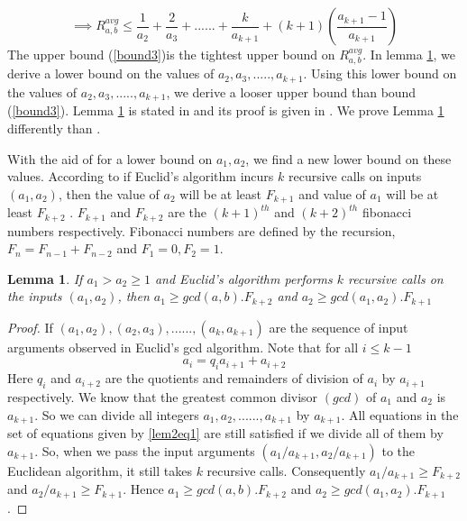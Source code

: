 \documentclass[pdflatex,sn-mathphys-num]{sn-jnl}%
\newtheorem{lem}{Lemma}
\theoremstyle{thmstyleone}%
\theoremstyle{thmstyletwo}%
\theoremstyle{thmstylethree}%
\begin{document}
\begin{equation}\label{bound3}
 \implies R_{a,b}^{avg} \le  \frac{1}{a_2}+\frac{2}{a_3}+......+\frac{k}{a_{k+1}}+(k+1)\left(\frac{a_{k+1}-1}{a_{k+1}}\right) 
\end{equation}
The upper bound (\ref{bound3})is the tightest upper bound on $R_{a,b}^{avg}$.
In lemma \ref{lem2}, we derive a lower bound on the values of $a_2,a_3,.....,a_{k+1}$. Using this lower bound on the values of $a_2,a_3,.....,a_{k+1}$, we derive a looser upper bound than bound (\ref{bound3}). Lemma \ref{lem2} is stated in \cite{cormen2009introduction} and its proof is given in \cite{Cormen_Sol_ref}. We prove Lemma \ref{lem2} differently than  \cite{Cormen_Sol_ref}.
\par With the aid of \cite[Lemma 31.10]{cormen2009introduction} for a lower bound on $a_1,a_2$, we find a new lower bound on these values. According to \cite[Lemma 31.10]{cormen2009introduction} 
if Euclid's algorithm incurs $k$ recursive calls on inputs $(a_1,a_2)$, then the value of $a_2$ will be at least $F_{k+1}$ and value of $a_1$ will be at least $F_{k+2}$ \cite[Lemma 31.10]{cormen2009introduction}. $F_{k+1}$ and $F_{k+2}$ are the  $(k+1)^{th}$ and $(k+2)^{th}$  fibonacci numbers respectively. Fibonacci numbers are defined by the recursion, $F_n=F_{n-1}+F_{n-2}$ and $F_{1}=0,F_2=1$. 
\newline
\begin{lem}\label{lem2}
If $a_1>a_2\ge 1$ and Euclid's algorithm performs $k$ recursive calls on the inputs $(a_1,a_2)$, then $a_1\ge gcd(a,b).F_{k+2}$ and $a_2 \ge gcd(a_1,a_2).F_{k+1}$

\end{lem}
\begin{proof}
   If $(a_1,a_2),(a_2,a_3),......,(a_k,a_{k+1})$ are the sequence of input arguments observed in Euclid's gcd algorithm. Note that for all $i\le k-1$ 
\begin{equation}\label{lem2eq1}
a_i=q_ia_{i+1}+a_{i+2}   
\end{equation}
    Here $q_i$ and $a_{i+2}$ are the quotients and remainders of division of $a_i$ by $a_{i+1}$ respectively.
    We know that the greatest common divisor $(gcd)$ of $a_1$ and $a_2$ is $a_{k+1}$. So we can divide all integers $a_1,a_2,......,a_{k+1}$ by $a_{k+1}$. All equations in the set of equations given by \ref{lem2eq1} are still satisfied if we divide all of them by $a_{k+1}$. So, when we pass the input arguments $(a_1/a_{k+1},a_2/a_{k+1})$ to the Euclidean algorithm, it still takes $k$ recursive calls. Consequently $a_1/a_{k+1} \ge F_{k+2}$ and $a_2/a_{k+1} \ge F_{k+1}$. Hence $a_1\ge gcd(a,b).F_{k+2}$ and $a_2 \ge gcd(a_1,a_2).F_{k+1}$.
\end{proof}
\end{document}
